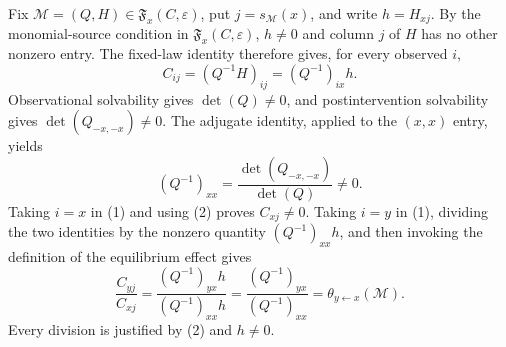 Fix \(\mathcal M=(Q,H)\in\mathfrak F_x(C,\varepsilon)\), put \(j=s_{\mathcal M}(x)\), and write \(h=H_{xj}\). By the monomial-source condition in \(\mathfrak F_x(C,\varepsilon)\), \(h\ne0\) and column \(j\) of \(H\) has no other nonzero entry. The fixed-law identity therefore gives, for every observed \(i\),
\[
 C_{ij}=(Q^{-1}H)_{ij}=(Q^{-1})_{ix}h. \tag{1}
\]
Observational solvability gives \(\det(Q)\ne0\), and postintervention solvability gives \(\det(Q_{-x,-x})\ne0\). The adjugate identity, applied to the \((x,x)\) entry, yields
\[
 (Q^{-1})_{xx}=\frac{\det(Q_{-x,-x})}{\det(Q)}\ne0. \tag{2}
\]
Taking \(i=x\) in (1) and using (2) proves \(C_{xj}\ne0\). Taking \(i=y\) in (1), dividing the two identities by the nonzero quantity \((Q^{-1})_{xx}h\), and then invoking the definition of the equilibrium effect gives
\[
 \frac{C_{yj}}{C_{xj}}
 =\frac{(Q^{-1})_{yx}h}{(Q^{-1})_{xx}h}
 =\frac{(Q^{-1})_{yx}}{(Q^{-1})_{xx}}
 =\theta_{y\leftarrow x}(\mathcal M).
\]
Every division is justified by (2) and \(h\ne0\).